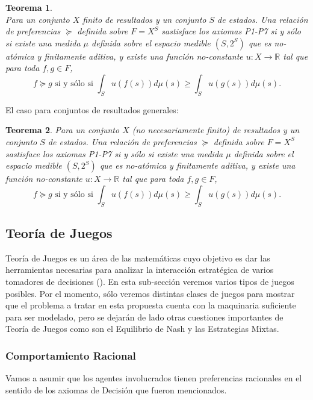 \documentclass[11pt]{article}
\theoremstyle{plain}
\newtheorem{teo}{Teorema}
\begin{document}
	    \begin{teo}{\cite{savage1954the}}\\
	    Para un conjunto $X$ finito de resultados y un conjunto $S$ de estados. Una relación de preferencias $\succeq$ definida sobre $F=X^S$ sastisface los axiomas P1-P7 si y sólo si existe una medida $\mu$ definida sobre el espacio medible $(S, 2^S)$ que es no-atómica y finitamente aditiva, y existe una función no-constante $u :X \to \mathbb{R}$ tal que para toda $f,g \in F$,
	    \[ f \succeq g \textrm{ si y sólo si } \int_S u(f(s)) d \mu(s) \geq \int_S u(g(s)) d \mu(s). \]
	    \end{teo}
	    El caso para conjuntos de resultados generales:
	    \begin{teo}
	    Para un conjunto $X$ (no necesariamente finito) de resultados y un conjunto $S$ de estados. Una relación de preferencias $\succeq$ definida sobre $F=X^S$ sastisface los axiomas P1-P7 si y sólo si existe una medida $\mu$ definida sobre el espacio medible $(S, 2^S)$ que es no-atómica y finitamente aditiva, y existe una función no-constante $u :X \to \mathbb{R}$ tal que para toda $f,g \in F$,
	    \[ f \succeq g \textrm{ si y sólo si } \int_S u(f(s)) d \mu(s) \geq \int_S u(g(s)) d \mu(s). \]
	    \end{teo}
	\subsection{Teoría de Juegos}
	Teoría de Juegos es un área de las matemáticas cuyo objetivo es dar las herramientas necesarias para analizar la interacción estratégica de varios tomadores de decisiones (\cite{osborne1994course}). En esta sub-sección veremos varios tipos de juegos posibles. Por el momento, sólo veremos distintas clases de juegos para mostrar que el problema a tratar en esta propuesta cuenta con la maquinaria suficiente para ser modelado, pero se dejarán de lado otras cuestiones importantes de Teoría de Juegos como son el Equilibrio de Nash y las Estrategias Mixtas. 
		\subsubsection{Comportamiento Racional}
		Vamos a asumir que los agentes involucrados tienen preferencias racionales en el sentido de los axiomas de Decisión que fueron mencionados.
\end{document}
